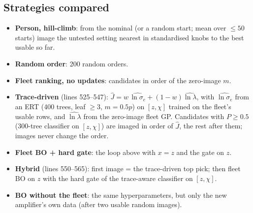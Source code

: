 \documentclass[10pt,a4paper]{article}
\begin{document}
\subsection{Strategies compared}\label{sec:strategies}
\begin{itemize}
\item \textbf{Person, hill-climb}: from the nominal (or a random start; mean over $\le50$ starts) image the untested setting
  nearest in standardised knobs to the best usable so far.
\item \textbf{Random order}: 200 random orders.
\item \textbf{Fleet ranking, no updates}: candidates in order of the zero-image $m$.
\item \textbf{Trace-driven} (lines 525--547): $\hat J=w\,\widehat{\ln\sigma_e}+(1-w)\widehat{\ln\lambda}$, with
  $\widehat{\ln\sigma_e}$ from an ERT (400 trees, leaf $\ge3$, $m=0.5p$) on $[z,\chi]$ trained on the fleet's usable rows, and
  $\widehat{\ln\lambda}$ from the zero-image fleet GP. Candidates with $P\ge0.5$ (300-tree classifier on $[z,\chi]$) are imaged in
  order of $\hat J$, the rest after them; images never change the order.
\item \textbf{Fleet BO + hard gate}: the loop above with $x=z$ and the gate on $z$.
\item \textbf{Hybrid} (lines 550--565): first image = the trace-driven top pick; then fleet BO on $z$ with the hard gate of the
  trace-aware classifier on $[z,\chi]$.
\item \textbf{BO without the fleet}: the same hyperparameters, but only the new amplifier's own data (after two usable random images).
\end{itemize}
\end{document}
